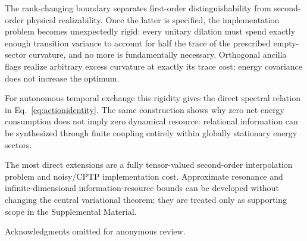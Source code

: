 \documentclass[aps,pra,preprint,nofootinbib]{revtex4-2}
\begin{document}
The rank-changing boundary separates first-order distinguishability from second-order physical realizability. Once the latter is specified, the implementation problem becomes unexpectedly rigid: every unitary dilation must spend exactly enough transition variance to account for half the trace of the prescribed empty-sector curvature, and no more is fundamentally necessary. Orthogonal ancilla flags realize arbitrary excess curvature at exactly its trace cost; energy covariance does not increase the optimum.

For autonomous temporal exchange this rigidity gives the direct spectral relation in Eq.~\eqref{eq:actionidentity}. The same construction shows why zero net energy consumption does not imply zero dynamical resource: relational information can be synthesized through finite coupling entirely within globally stationary energy sectors.

The most direct extensions are a fully tensor-valued second-order interpolation problem and noisy/CPTP implementation cost. Approximate resonance and infinite-dimensional information-resource bounds can be developed without changing the central variational theorem; they are treated only as supporting scope in the Supplemental Material.

\begin{acknowledgments}
Acknowledgments omitted for anonymous review.
\end{acknowledgments}


\end{document}
